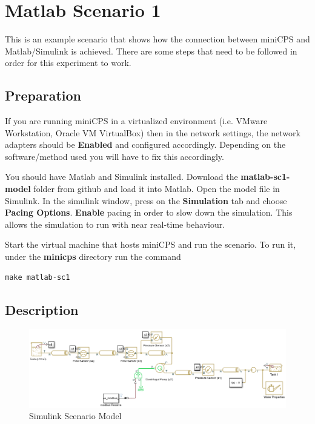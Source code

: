 \documentclass[book,a4paper,12pt]{memoir}
\begin{document}
\chapter{Matlab Scenario 1}
\label{cha:matlabsc1}

This is an example scenario that shows how the connection between miniCPS and Matlab/Simulink is achieved.  There are some steps that need to be followed in order for this experiment to work.

\section{Preparation}
\label{cha:basicuse-sec:prepare}

If you are running miniCPS in a virtualized environment (i.e. VMware Workstation, Oracle VM VirtualBox) then in the network settings, the network adapters should be \textbf{Enabled} and configured accordingly.  Depending on the software/method used you will have to fix this accordingly.   

You should have Matlab and Simulink installed.  Download the \textbf{matlab-sc1-model} folder from github and load it into Matlab.  Open the model file in Simulink.  In the simulink window, press on the \textbf{Simulation} tab and choose \textbf{Pacing Options}.  \textbf{Enable} pacing in order to slow down the simulation.  This allows the simulation to run with near real-time behaviour.

Start the virtual machine that hosts miniCPS and run the scenario.  To run it, under the \textbf{minicps} directory run the command
\begin{lstlisting}[backgroundcolor = \color{ultralightgray}, language = Python, xleftmargin = 0.1cm, framexleftmargin = 0.3em, showstringspaces=false]
make matlab-sc1
\end{lstlisting}

\section{Description}
\label{cha:basicuse-sec:description}

\begin{figure}[h!]
	\centering
	\includegraphics[scale=0.8, angle=90]{SimulinkScenario}
	\caption{Simulink Scenario Model}
\end{figure}
\end{document}
